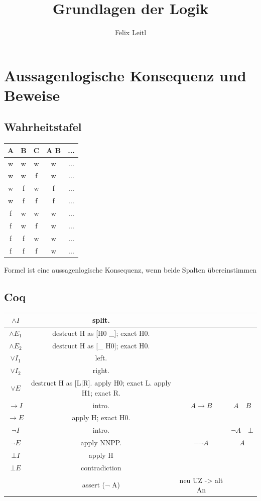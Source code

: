 \documentclass[a4paper]{article}
\title{Grundlagen der Logik}
\author{Felix Leitl}
\begin{document}
	\maketitle
	\newpage
	\section{Aussagenlogische Konsequenz und Beweise}
		\subsection{Wahrheitstafel}
			\begin{center}
				\begin{tabular}{c|c|c|c|c}
					A & B & C & A \to B & ...\\
					\hline
					w & w & w & w & ...\\
					\hline
					w & w & f & w & ...\\
					\hline
					w & f & w & f & ...\\
					\hline
					w & f & f & f & ...\\
					\hline
					f & w & w & w & ...\\ 
					\hline
					f & w & f & w & ...\\
					\hline
					f & f & w & w & ...\\
					\hline
					f & f & f & w & ...
				\end{tabular}
			\end{center}
		Formel ist eine aussagenlogische Konsequenz, wenn beide Spalten übereinstimmen
		\subsection{Coq}
			\begin{center}
				\begin{tabular} {c|c|c|c}
					$\land I$ & split. &  \\
					\hline
					$\land E_1$ & destruct H as [H0 \_]; exact H0. &  \\
					\hline
					$\land E_2$ & destruct H as [\_ H0]; exact H0. &  \\
					\hline
					$\lor I_1$ & left. &  \\
					\hline
					$\lor I_2$ & right. &  \\
					\hline
					$\lor E$ & destruct H as [L|R]. apply H0; exact L. apply H1; exact R. \\
					\hline
					$\to I$ & intro. & $A \to B$ & $A \quad B$ \\
					\hline
					$\to E$ & apply H; exact H0. &  \\
					\hline
					$\lnot I$ & intro. & & $\lnot A \quad \bot$ \\ 
					\hline
					$\lnot E$ & apply NNPP. & $\lnot\lnot A$ & $A$ \\
					\hline
					$\bot I$ & apply H & & \\
					\hline
					$\bot E$ & contradiction & & \\
					\hline
					& assert ($\lnot$ A) &  neu UZ -> alt An 
				\end{tabular}
			\end{center}
\end{document}
